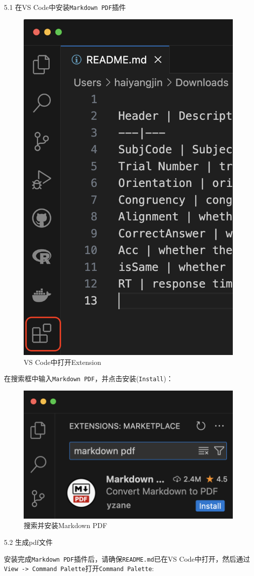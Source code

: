 \documentclass[]{ctexbook}
\theoremstyle{definition}
\theoremstyle{definition}
\theoremstyle{definition}
\theoremstyle{definition}
\theoremstyle{remark}
\begin{document}
5.1 在VS Code中安装\texttt{Markdown\ PDF}插件

\begin{figure}

{\centering \includegraphics[width=0.4\linewidth]{img/vscode/mkreadme_extension} 

}

\caption{VS Code中打开Extension}\label{fig:mkreadme-extension}
\end{figure}

在搜索框中输入\texttt{Markdown\ PDF}，并点击安装(\texttt{Install})：

\begin{figure}

{\centering \includegraphics[width=0.5\linewidth]{img/vscode/mkreadme_markdownpdf} 

}

\caption{搜索并安装Markdown PDF}\label{fig:mkreadme-markdownpdf}
\end{figure}

5.2 生成pdf文件

安装完成\texttt{Markdown\ PDF}插件后，请确保\texttt{README.md}已在VS Code中打开，然后通过\texttt{View\ -\textgreater{}\ Command\ Palette}打开\texttt{Command\ Palette}:
\end{document}
